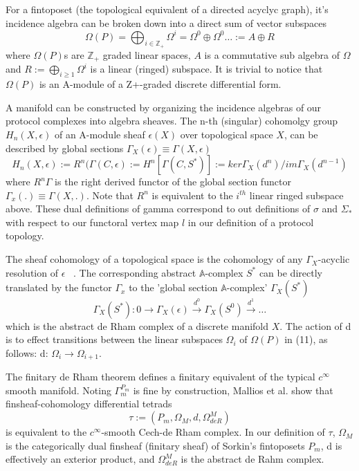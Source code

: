 \documentclass[runningheads]{llncs}
\begin{document}
For a fintoposet (the topological equivalent of a directed acyclyc graph), it's incidence algebra can be broken down into a direct sum of vector subspaces
\begin{equation}
\Omega(P) = \bigoplus_{i \in \mathbb{Z}_+} \Omega^i = \Omega^0 \oplus \Omega^0 \dots := A \oplus R
\end{equation}
where $\Omega(P)$s are $\mathbb{Z}_+$ graded linear spaces, $A$ is a commutative sub algebra of $\Omega$ and $R := \bigoplus_{i \geq 1} \Omega^i$ is a linear (ringed) subspace. It is trivial to notice that $\Omega(P)$ is an A-module of a Z+-graded discrete differential form. 

A manifold can be constructed by organizing the incidence algebras of our protocol complexes into algebra sheaves. The n-th (singular) cohomolgy group $H_n(X, \epsilon)$ of an A-module sheaf $\epsilon(X)$ over topological space $X$, can be described by global sections $\Gamma_X(\epsilon) \equiv \Gamma (X, \epsilon)$
\begin{equation}
H_n(X, \epsilon) := R^n(\Gamma(C,\epsilon) := H^n[\Gamma(C, S^*)] := ker\Gamma_X(d^n)/im\Gamma_X(d^{n-1})
\end{equation}
where $R^n\Gamma$ is the right derived functor of the global section functor $\Gamma_x(.) \equiv \Gamma(X,.)$. Note that $R^n$ is equivalent to the $i^{th}$ linear ringed subspace above. These dual definitions of gamma correspond to out definitions of $\sigma$ and $\Sigma_*$ with respect to our functoral vertex map $l$ in our definition of a protocol topology.

The sheaf cohomology of a topological space is the cohomology of any $\Gamma_X$-acyclic resolution of $\epsilon$ ~\cite{ref_book1}. The corresponding abstract $\mathbb{A}$-complex $S^*$ can be directly translated by the functor $\Gamma_x$ to the 'global section $\mathbb{A}$-complex' $\Gamma_X(S^*)$
\begin{equation}
\Gamma_X(S^*):  0 \xrightarrow{~} \Gamma_X(\epsilon) \xrightarrow{d^0} \Gamma_X(S^0) \xrightarrow{d^1} \dots
\end{equation}
which is the abstract de Rham complex of a discrete manifold $X$. The action of d is to effect transitions between the linear subspaces $\Omega_i$ of $\Omega(P)$ in (11), as follows: d: $\Omega_i \rightarrow \Omega_{i+1}$.

The finitary de Rham theorem defines a finitary equivalent of the typical $c^{\infty}$ smooth manifold. Noting $\Gamma^{P_m}_m$ is fine by construction, Mallios et al. show that finsheaf-cohomology differential tetrads
\begin{equation}
\tau := (P_m, \Omega_M, d, \Omega^M_{deR})
\end{equation}
is equivalent to the $c^{\infty}$-smooth Cech-de Rham complex. In our definition of $\tau$, $\Omega_M$ is the categorically dual finsheaf (finitary sheaf) of Sorkin's  fintoposets $P_m$, d is effectively an exterior product, and $ \Omega^M_{deR}$ is the abstract de Rahm complex.
\end{document}
